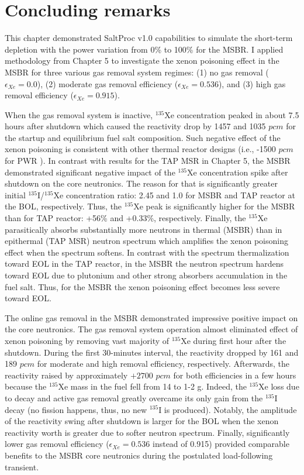 \section{Concluding remarks}
This chapter demonstrated SaltProc v1.0 capabilities to simulate the 
short-term depletion with the power variation from 0\% to 100\% for the 
\gls{MSBR}. I applied methodology from Chapter 5 to investigate the xenon 
poisoning effect in the \gls{MSBR} for three various gas removal system 
regimes: (1) no gas removal ($\epsilon_{Xe}=0.0$), (2) moderate gas removal 
efficiency ($\epsilon_{Xe}=0.536$), and (3) high gas removal efficiency 
($\epsilon_{Xe}=0.915$). 

When the gas removal system is inactive, $^{135}$Xe concentration peaked in 
about 7.5 hours after shutdown which caused the reactivity drop by 1457 and 
1035 $pcm$ for the startup and equilibrium fuel salt composition. Such 
negative effect of the xenon poisoning is consistent with other thermal 
reactor designs (i.e., -1500 $pcm$ for \gls{PWR} 
\cite{rykhlevskii_impact_2019}). In contrast with results for the \gls{TAP} 
\gls{MSR} in Chapter 5, the \gls{MSBR} demonstrated significant negative 
impact of the $^{135}$Xe concentration spike after shutdown on the core 
neutronics. The reason for that is significantly greater initial 
$^{135}$I/$^{135}$Xe concentration ratio: 2.45 and 1.0 for \gls{MSBR} and 
\gls{TAP} reactor at the \gls{BOL}, respectively. Thus, the $^{135}$Xe peak is 
significantly higher for the \gls{MSBR} than for \gls{TAP} reactor: +56\% 
and +0.33\%, respectively. Finally, the $^{135}$Xe parasitically absorbs 
substantially more neutrons in thermal (\gls{MSBR}) than in epithermal 
(\gls{TAP} \gls{MSR}) neutron spectrum which amplifies the xenon poisoning 
effect when the spectrum softens. In contrast with the spectrum thermalization 
toward \gls{EOL} in the \gls{TAP} reactor, in the \gls{MSBR} the neutron 
spectrum hardens toward \gls{EOL} due to plutonium and other strong absorbers 
accumulation in the fuel salt. Thus, for the \gls{MSBR} the xenon poisoning 
effect becomes less severe toward \gls{EOL}. 

The online gas removal in the \gls{MSBR} demonstrated impressive positive 
impact on the core neutronics. The gas removal system operation almost 
eliminated effect of xenon poisoning by removing vast majority of $^{135}$Xe 
during first hour after the shutdown. During the first 30-minutes interval, 
the reactivity dropped by 161 and 189 $pcm$ for moderate and high removal 
efficiency, respectively. Afterwards, the reactivity raised by approximately 
$+2700$ $pcm$ for both efficiencies in a few hours because the $^{135}$Xe mass 
in the fuel fell from 14 to 1-2 g. Indeed, the $^{135}$Xe loss due to decay 
and active gas removal greatly  overcame its only gain from the $^{135}$I 
decay (no fission happens, thus, no new $^{135}$I is produced). Notably, the 
amplitude of the reactivity swing after shutdown is larger for the \gls{BOL} 
when the xenon reactivity worth is greater due to softer neutron spectrum. 
Finally, significantly lower gas removal efficiency ($\epsilon_{Xe}=0.536$ 
instead of 0.915) provided comparable benefits to the \gls{MSBR} core 
neutronics during the postulated load-following transient.

